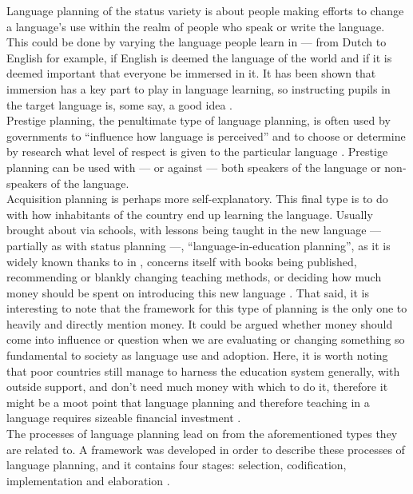 \documentclass[12pt]{article}
\begin{document}
Language planning of the status variety is about people making efforts
to change a language's use within the realm of people who speak or
write the language. This could be done by varying the language people
learn in --- from Dutch to English for example, if English is deemed
the language of the world and if it is deemed important that everyone
be immersed in it. It has been shown that immersion has a key part to
play in language learning, so instructing pupils in the target
language is, some say, a good idea \citep{immersion-education}.\\

Prestige planning, the penultimate type of language planning, is often
used by governments to ``influence how language is perceived'' and to
choose or determine by research what level of respect is given to the
particular language \citep[p.\ 296]{soas-language-planning}. Prestige
planning can be used with --- or against --- both speakers of the
language or non-speakers of the language.\\

Acquisition planning is perhaps more self-explanatory. This final type
is to do with how inhabitants of the country end up learning the
language. Usually brought about via schools, with lessons being taught
in the new language --- partially as with status planning ---,
``language-in-education planning'', as it is widely known thanks to
\citeauthor{language-kaplan} in \citeyear{language-kaplan}, concerns
itself with books being published, recommending or blankly changing
teaching methods, or deciding how much money should be spent on
introducing this new language \citep{language-kaplan}. That said, it
is interesting to note that the framework for this type of planning is
the only one to heavily and directly mention money. It could be argued
whether money should come into influence or question when we are
evaluating or changing something so fundamental to society as language
use and adoption. Here, it is worth noting that poor countries still
manage to harness the education system generally, with outside
support, and don't need much money with which to do it, therefore it
might be a moot point that language planning and therefore teaching in
a language requires sizeable financial investment
\citep{developing-countries-primary-education}.\\

The processes of language planning lead on from the aforementioned
types they are related to. A framework was developed in order to
describe these processes of language planning, and it contains four
stages: selection, codification, implementation and elaboration
\citep[p.\ 375]{sociolinguistics-mesthrie}.\\
\end{document}
